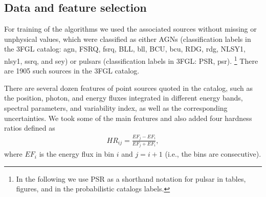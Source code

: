 \documentclass[referee]{aa} %
\newcommand{\bea}{\begin{eqnarray}}
\newcommand{\eea}{\end{eqnarray}}
\newcommand{\lb}{\label}
\begin{document}
\subsection{Data and feature selection}

For training of the algorithms we used the associated sources without missing or unphysical values, 
which were classified as either AGNs (classification labels in the 3FGL catalog: agn, FSRQ, fsrq, BLL, bll, BCU, bcu, RDG, rdg, NLSY1, nlsy1, ssrq, and sey) or pulsars (classification labels in 3FGL: PSR, psr).%
\footnote{In the following we use PSR as a shorthand notation for pulsar in tables, figures, and in the probabilistic catalogs labels.}
There are 1905 such sources in the 3FGL catalog. 

There are several dozen features of point sources quoted in the catalog, such as the position, photon, and energy fluxes integrated in different energy bands, spectral parameters, and variability index, as well as the corresponding uncertainties. 
We took some of the main features and also added four hardness ratios defined as 
\bea
\lb{eq:hr}
HR_{ij} = \frac{EF_j - EF_i}{EF_j + EF_i},
\eea
where $EF_i$ is the energy flux in bin $i$ and $j = i + 1$ (i.e., the bins are consecutive).
\end{document}
